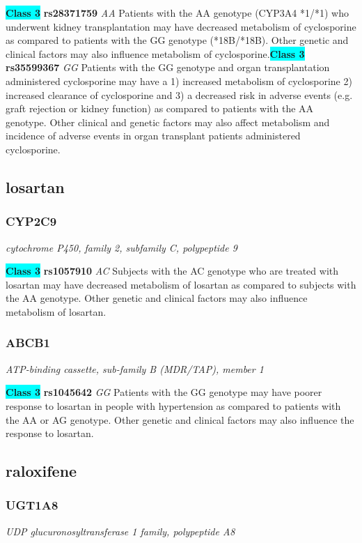 \documentclass{report}
\begin{document}
\textbf{\colorbox{cyan} {Class 3}} \textbf{ rs28371759 } \textit{ AA }
Patients with the AA genotype (CYP3A4 *1/*1) who underwent kidney transplantation may have decreased metabolism of cyclosporine as compared to patients with the GG genotype (*18B/*18B). Other genetic and clinical factors may also influence metabolism of cyclosporine.\newline\textbf{\colorbox{cyan} {Class 3}} \textbf{ rs35599367 } \textit{ GG }
Patients with the GG genotype and organ transplantation administered cyclosporine may have a 1) increased metabolism of cyclosporine 2) increased clearance of cyclosporine and 3) a decreased risk in adverse events (e.g. graft rejection or kidney function) as compared to patients with the AA genotype. Other clinical and genetic factors may also affect metabolism and incidence of adverse events in organ transplant patients administered cyclosporine. \newline\subsection{ losartan }\subsubsection{ CYP2C9 }
\textit{ cytochrome P450, family 2, subfamily C, polypeptide 9 }

\textbf{\colorbox{cyan} {Class 3}} \textbf{ rs1057910 } \textit{ AC }
Subjects with the AC genotype who are treated with losartan may have decreased metabolism of losartan as compared to subjects with the AA genotype. Other genetic and clinical factors may also influence metabolism of losartan.\newline\subsubsection{ ABCB1 }
\textit{ ATP-binding cassette, sub-family B (MDR/TAP), member 1 }

\textbf{\colorbox{cyan} {Class 3}} \textbf{ rs1045642 } \textit{ GG }
Patients with the GG genotype may have poorer response to losartan in people with hypertension as compared to patients with the AA or AG genotype. Other genetic and clinical factors may also influence the response to losartan.\newline\subsection{ raloxifene }\subsubsection{ UGT1A8 }
\textit{ UDP glucuronosyltransferase 1 family, polypeptide A8 }
\end{document}
